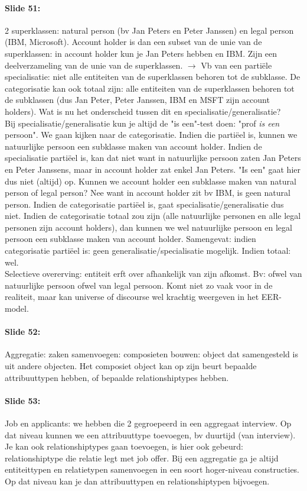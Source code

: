 \documentclass[10pt,a4paper]{report}
\begin{document}
\paragraph{Slide 51:}2 superklassen: natural person (bv Jan Peters en Peter Janssen) en legal person (IBM, Microsoft). Account holder is dan een subset van de unie van de superklassen: in account holder kun je Jan Peters hebben en IBM. Zijn een deelverzameling van de unie van de superklassen. $\rightarrow$ Vb van een partiële specialisatie: niet alle entiteiten van de superklassen behoren tot de subklasse. De categorisatie kan ook totaal zijn: alle entiteiten van de superklassen behoren tot de subklassen (dus Jan Peter, Peter Janssen, IBM en MSFT zijn account holders). Wat is nu het onderscheid tussen dit en specialisatie/generalisatie?\\
Bij specialisatie/generalisatie kun je altijd de "is een"-test doen: "prof \emph{is een} persoon". We gaan kijken naar de categorisatie. Indien die partiëel is, kunnen we natuurlijke persoon een subklasse maken van account holder. Indien de specialisatie partiëel is, kan dat niet want in natuurlijke persoon zaten Jan Peters en Peter Janssens, maar in account holder zat enkel Jan Peters. "Is een" gaat hier dus niet (altijd) op. Kunnen we account holder een subklasse maken van natural person of legal person? Nee want in account holder zit bv IBM, is geen natural person. Indien de categorisatie partiëel is, gaat specialisatie/generalisatie dus niet. Indien de categorisatie totaal zou zijn (alle natuurlijke personen en alle legal personen zijn account holders), dan kunnen we wel natuurlijke persoon en legal persoon een subklasse maken van account holder.
Samengevat: indien categorisatie partiëel is: geen generalisatie/specialisatie mogelijk. Indien totaal: wel.\\
Selectieve overerving: entiteit erft over afhankelijk van zijn afkomst. Bv: ofwel van natuurlijke persoon ofwel van legal persoon. Komt niet zo vaak voor in de realiteit, maar kan universe of discourse wel krachtig weergeven in het EER-model.

\paragraph{Slide 52:}Aggregatie: zaken samenvoegen: composieten bouwen: object dat samengesteld is uit andere objecten. Het composiet object kan op zijn beurt bepaalde attribuuttypen hebben, of bepaalde relationshiptypes hebben.

\paragraph{Slide 53:}Job en applicants: we hebben die 2 gegroepeerd in een aggregaat interview. Op dat niveau kunnen we een attribuuttype toevoegen, bv duurtijd (van interview). Je kan ook relationshiptypes gaan toevoegen, is hier ook gebeurd: relationshiptype die relatie legt met job offer. Bij een aggregatie ga je altijd entiteittypen en relatietypen samenvoegen in een soort hoger-niveau constructies. Op dat niveau kan je dan attribuuttypen en relationshiptypen bijvoegen.
\end{document}
